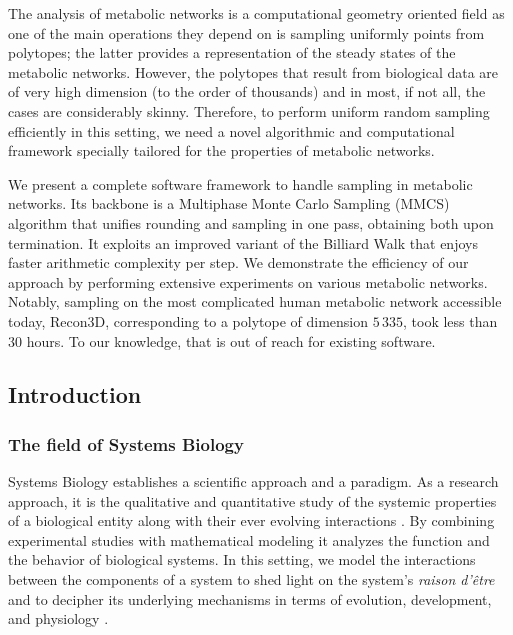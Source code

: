    The analysis of metabolic networks is a computational geometry oriented field
   as one of the main operations they depend on is sampling uniformly points from  polytopes;
   the latter provides a representation of the steady states of the metabolic networks.
   However, the polytopes that result from biological data are of very high dimension (to the order of thousands) and in most, if not all, the cases are considerably skinny.
   Therefore, to perform uniform random sampling efficiently in this setting, we need
   a novel algorithmic and computational framework specially tailored
   for the properties of metabolic networks.

   We present a complete software framework to handle sampling in metabolic networks.
   Its backbone is a Multiphase Monte Carlo Sampling (MMCS) algorithm
   that unifies rounding and sampling in one pass, obtaining both upon termination.
   It exploits an
   improved variant of the Billiard Walk that enjoys faster arithmetic complexity per step.
   We demonstrate the efficiency of our approach by performing extensive experiments
   on various metabolic networks.
   Notably, sampling on the most complicated human metabolic network accessible today, Recon3D,
   corresponding to a polytope of dimension  $5\,335$, took less than $30$ hours.
   To our knowledge, that is out of reach for existing software.





\subsection{Introduction}
\label{sec:mmcs-intro}

   \subsubsection*{The field of Systems Biology}

   Systems Biology establishes a scientific approach and a paradigm. As a
   research approach, it is the qualitative and quantitative study of the systemic
   properties of a biological entity along with their ever evolving interactions
   \citep{klipp2016systems, kohl2010systems}.
   By combining experimental studies  with mathematical
   modeling it analyzes the function and the behavior of biological systems.
   In this setting, we model the interactions between the  components of a system
   to shed light  on the system's \textit{raison d'être} and to decipher its underlying mechanisms
   in terms of evolution, development, and physiology \citep{ideker2001new}.

